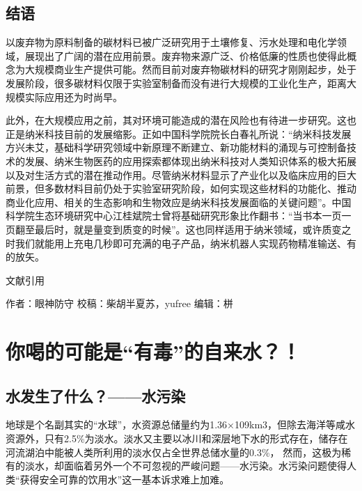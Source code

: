 \documentclass[]{book}
\begin{document}
\hypertarget{ux7ed3ux8bed}{%
\subsection{结语}\label{ux7ed3ux8bed}}

以废弃物为原料制备的碳材料已被广泛研究用于土壤修复、污水处理和电化学领域，展现出了广阔的潜在应用前景。废弃物来源广泛、价格低廉的性质也使得此概念为大规模商业生产提供可能。然而目前对废弃物碳材料的研究才刚刚起步，处于发展阶段，很多碳材料仅限于实验室制备而没有进行大规模的工业化生产，距离大规模实际应用还为时尚早。

此外，在大规模应用之前，其对环境可能造成的潜在风险也有待进一步研究。这也正是纳米科技目前的发展缩影。正如中国科学院院长白春礼所说：``纳米科技发展方兴未艾，基础科学研究领域中新原理不断建立、新功能材料的涌现与可控制备技术的发展、纳米生物医药的应用探索都体现出纳米科技对人类知识体系的极大拓展以及对生活方式的潜在推动作用。尽管纳米材料显示了产业化以及临床应用的巨大前景，但多数材料目前仍处于实验室研究阶段，如何实现这些材料的功能化、推动商业化应用、相关的生态影响和生物效应是纳米科技发展面临的关键问题''。中国科学院生态环境研究中心江桂斌院士曾将基础研究形象比作翻书：``当书本一页一页翻至最后时，就是量变到质变的时候''。这也同样适用于纳米领域，或许质变之时我们就能用上充电几秒即可充满的电子产品，纳米机器人实现药物精准输送、有的放矢。

文献引用

作者：眼神防守
校稿：柴胡半夏苏，yufree
编辑：栟

\hypertarget{ux4f60ux559dux7684ux53efux80fdux662fux6709ux6bd2ux7684ux81eaux6765ux6c34}{%
\section{你喝的可能是``有毒''的自来水？！}\label{ux4f60ux559dux7684ux53efux80fdux662fux6709ux6bd2ux7684ux81eaux6765ux6c34}}

\hypertarget{ux6c34ux53d1ux751fux4e86ux4ec0ux4e48ux6c34ux6c61ux67d3}{%
\subsection{水发生了什么？------水污染}\label{ux6c34ux53d1ux751fux4e86ux4ec0ux4e48ux6c34ux6c61ux67d3}}

地球是个名副其实的``水球''，水资源总储量约为1.36×109km3，但除去海洋等咸水资源外，只有2.5\%为淡水。淡水又主要以冰川和深层地下水的形式存在，储存在河流湖泊中能被人类所利用的淡水仅占全世界总储水量的0.3\%， 然而，这极为稀有的淡水，却面临着另外一个不可忽视的严峻问题------水污染。水污染问题使得人类``获得安全可靠的饮用水''这一基本诉求难上加难。
\end{document}
